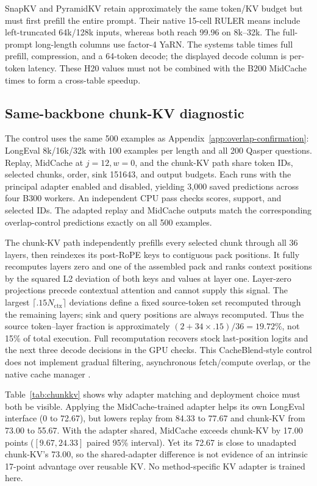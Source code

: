 
SnapKV and PyramidKV retain approximately the same token/KV budget but must first prefill the entire prompt. Their native 15-cell RULER means include left-truncated 64k/128k inputs, whereas both reach 99.96 on 8k--32k. The full-prompt long-length columns use factor-4 YaRN. The systems table times full prefill, compression, and a 64-token decode; the displayed decode column is per-token latency. These H20 values must not be combined with the B200 MidCache times to form a cross-table speedup.

\subsection{Same-backbone chunk-KV diagnostic}
\label{app:chunkkv}

The control uses the same 500 examples as Appendix~\ref{app:overlap-confirmation}: LongEval 8k/16k/32k with 100 examples per length and all 200 Qasper questions. Replay, MidCache at $j=12,w=0$, and the chunk-KV path share token IDs, selected chunks, order, sink 151643, and output budgets. Each runs with the principal adapter enabled and disabled, yielding 3,000 saved predictions across four B300 workers. An independent CPU pass checks scores, support, and selected IDs. The adapted replay and MidCache outputs match the corresponding overlap-control predictions exactly on all 500 examples.

The chunk-KV path independently prefills every selected chunk through all 36 layers, then reindexes its post-RoPE keys to contiguous pack positions. It fully recomputes layers zero and one of the assembled pack and ranks context positions by the squared L2 deviation of both keys and values at layer one. Layer-zero projections precede contextual attention and cannot supply this signal. The largest $\lceil .15N_{\mathrm{ctx}}\rceil$ deviations define a fixed source-token set recomputed through the remaining layers; sink and query positions are always recomputed. Thus the source token--layer fraction is approximately $(2+34\times.15)/36=19.72\%$, not 15\% of total execution. Full recomputation recovers stock last-position logits and the next three decode decisions in the GPU checks. This CacheBlend-style control does not implement gradual filtering, asynchronous fetch/compute overlap, or the native cache manager \citep{cacheblend}.

Table~\ref{tab:chunkkv} shows why adapter matching and deployment choice must both be visible. Applying the MidCache-trained adapter helps its own LongEval interface (0 to 72.67), but lowers replay from 84.33 to 77.67 and chunk-KV from 73.00 to 55.67. With the adapter shared, MidCache exceeds chunk-KV by 17.00 points ($[9.67,24.33]$ paired 95\% interval). Yet its 72.67 is close to unadapted chunk-KV's 73.00, so the shared-adapter difference is not evidence of an intrinsic 17-point advantage over reusable KV. No method-specific KV adapter is trained here.

